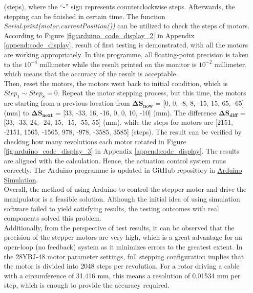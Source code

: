 (steps), where the “-” sign represents counterclockwise steps. Afterwards, the stepping can be finished in certain 
time. The function \emph{Serial.print(motor.currentPosition())} can be utilized to check the steps of motors.\\
According to Figure \ref{fig:arduino_code_display_2} in Appendix \ref{append:code_display}, result of first testing 
is demonstrated, with all the motors are working appropriately. In this programme, all floating-point precision 
is taken to the $10^{-4}$ millimeter while the result printed on the monitor is $10^{-2}$ millimeter, 
which means that the accuracy of the result is acceptable.\\
Then, reset the motors, the motors went back to initial condition, which is $Step_1 \sim Step_8=0$. Repeat the 
motor stepping process, but this time, the motors are starting from a previous location from
$\boldsymbol{\Delta S_{now}}$ = [0, 0, -8, 8, -15, 15, 65, -65] (mm) to $\boldsymbol{\Delta S_{next}}$ = 
[33, -33, 16, -16, 0, 0, 10, -10] (mm). The difference $\boldsymbol{\Delta S_{diff}}$ = 
[33, -33, 24, -24, 15, -15, -55, 55] (mm), while the steps for motors are 
[2151, -2151, 1565, -1565, 978, -978, -3585, 3585] (steps). The result can be verified by checking how many 
revolutions each motor rotated in Figure \ref{fig:arduino_code_display_3} in Appendix \ref{append:code_display}.
The results are aligned with the calculation. Hence, the actuation control system runs correctly.
The Arduino programme is updated in GitHub repository in 
\href{https://github.com/yezehao/Compact-Continuum-Manipulator-Platform/tree/main/Arduino-Simulation}
{Arduino Simulation}. \\
Overall, the method of using Arduino to control the stepper motor and drive the manipulator is a feasible solution. 
Although the initial idea of using simulation software failed to yield satisfying results, the testing outcomes with 
real components solved this problem.\\
Additionally, from the perspective of test results, it can be observed that the precision of the stepper motors are 
very high, which is a great advantage for an open-loop (no feedback) system as it minimizes errors to the greatest 
extent. In the 28YBJ-48 motor parameter settings, full stepping configuration implies that the motor is divided into 
2048 steps per revolution. For a rotor driving a cable with a circumference of 31.416 mm, this means a resolution of 
0.01534 mm per step, which is enough to provide the accuracy required.\\
